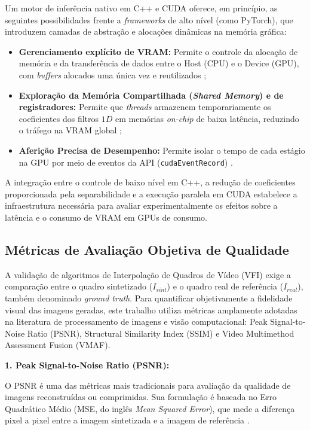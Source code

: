 \documentclass[
    12pt,                %
    openright,           %
    oneside,             %
    a4paper,             %
    english,             %
    brazil               %
]{abntex2}
\begin{document}
Um motor de inferência nativo em C++ e CUDA oferece, em princípio, as seguintes possibilidades frente a \textit{frameworks} de alto nível (como PyTorch), que introduzem camadas de abstração e alocações dinâmicas na memória gráfica:

\begin{itemize}
    \item \textbf{Gerenciamento explícito de VRAM:} Permite o controle da alocação de memória e da transferência de dados entre o Host (CPU) e o Device (GPU), com \textit{buffers} alocados uma única vez e reutilizados \cite{NvidiaCUDA2025};
    \item \textbf{Exploração da Memória Compartilhada (\textit{Shared Memory}) e de registradores:} Permite que \textit{threads} armazenem temporariamente os coeficientes dos filtros $1D$ em memórias \textit{on-chip} de baixa latência, reduzindo o tráfego na VRAM global \cite{Kirk2023};
    \item \textbf{Aferição Precisa de Desempenho:} Permite isolar o tempo de cada estágio na GPU por meio de eventos da API (\texttt{cudaEventRecord}) \cite{NvidiaCUDA2025}.
\end{itemize}

A integração entre o controle de baixo nível em C++, a redução de coeficientes proporcionada pela separabilidade e a execução paralela em CUDA estabelece a infraestrutura necessária para avaliar experimentalmente os efeitos sobre a latência e o consumo de VRAM em GPUs de consumo.

\subsection{Métricas de Avaliação Objetiva de Qualidade}

A validação de algoritmos de Interpolação de Quadros de Vídeo (VFI) exige a comparação entre o quadro sintetizado ($I_{sint}$) e o quadro real de referência ($I_{real}$), também denominado \textit{ground truth}. Para quantificar objetivamente a fidelidade visual das imagens geradas, este trabalho utiliza métricas amplamente adotadas na literatura de processamento de imagens e visão computacional: Peak Signal-to-Noise Ratio (PSNR), Structural Similarity Index (SSIM) e Video Multimethod Assessment Fusion (VMAF).

\textbf{1. Peak Signal-to-Noise Ratio (PSNR):}

O PSNR é uma das métricas mais tradicionais para avaliação da qualidade de imagens reconstruídas ou comprimidas. Sua formulação é baseada no Erro Quadrático Médio (MSE, do inglês \textit{Mean Squared Error}), que mede a diferença pixel a pixel entre a imagem sintetizada e a imagem de referência \cite{Hore2010}.
\end{document}
